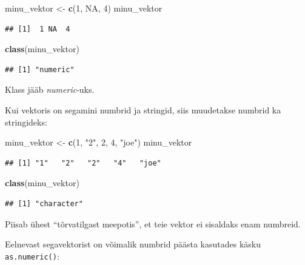 \documentclass[]{book}
\newenvironment{Shaded}{\begin{snugshade}}{\end{snugshade}}
\newcommand{\KeywordTok}[1]{\textcolor[rgb]{0.13,0.29,0.53}{\textbf{#1}}}
\newcommand{\DecValTok}[1]{\textcolor[rgb]{0.00,0.00,0.81}{#1}}
\newcommand{\StringTok}[1]{\textcolor[rgb]{0.31,0.60,0.02}{#1}}
\newcommand{\OtherTok}[1]{\textcolor[rgb]{0.56,0.35,0.01}{#1}}
\newcommand{\NormalTok}[1]{#1}
\begin{document}
\begin{Shaded}
\begin{Highlighting}[]
\NormalTok{minu_vektor <-}\StringTok{ }\KeywordTok{c}\NormalTok{(}\DecValTok{1}\NormalTok{, }\OtherTok{NA}\NormalTok{, }\DecValTok{4}\NormalTok{)}
\NormalTok{minu_vektor}
\end{Highlighting}
\end{Shaded}

\begin{verbatim}
## [1]  1 NA  4
\end{verbatim}

\begin{Shaded}
\begin{Highlighting}[]
\KeywordTok{class}\NormalTok{(minu_vektor)}
\end{Highlighting}
\end{Shaded}

\begin{verbatim}
## [1] "numeric"
\end{verbatim}

Klass jääb \emph{numeric}-uks.

Kui vektoris on segamini numbrid ja stringid, siis muudetakse numbrid ka
stringideks:

\begin{Shaded}
\begin{Highlighting}[]
\NormalTok{minu_vektor <-}\StringTok{ }\KeywordTok{c}\NormalTok{(}\DecValTok{1}\NormalTok{, }\StringTok{"2"}\NormalTok{, }\DecValTok{2}\NormalTok{, }\DecValTok{4}\NormalTok{, }\StringTok{"joe"}\NormalTok{)}
\NormalTok{minu_vektor}
\end{Highlighting}
\end{Shaded}

\begin{verbatim}
## [1] "1"   "2"   "2"   "4"   "joe"
\end{verbatim}

\begin{Shaded}
\begin{Highlighting}[]
\KeywordTok{class}\NormalTok{(minu_vektor)}
\end{Highlighting}
\end{Shaded}

\begin{verbatim}
## [1] "character"
\end{verbatim}

Piisab ühest ``tõrvatilgast meepotis'', et teie vektor ei sisaldaks enam
numbreid.

Eelnevast segavektorist on võimalik numbrid päästa kasutades käsku
\texttt{as.numeric()}:
\end{document}
